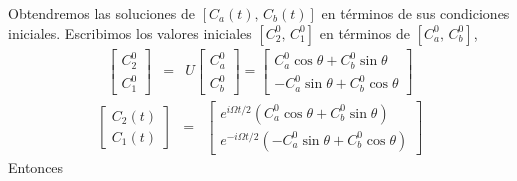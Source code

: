 \documentclass[twocolumn,aps,eqsecnum]{revtex4}
\begin{document}
Obtendremos las soluciones de $[ C_a(t), \, C_b(t) ]$ en 
t\'erminos de sus condiciones iniciales. Escribimos los valores 
iniciales $[ C_2^0, \, C_1^0 ]$ en t\'erminos de 
$[ C_a^0, \, C_b^0 ]$, 
%
\begin{eqnarray*}
\left[ \begin{array}{c} C_2^0 \\ C_1^0 \end{array} \right] 
&=& U \left[ \begin{array}{c} C_a^0 \\ C_b^0 \end{array} \right] 
= \left[ \begin{array}{c} C_a^0\cos{\theta} + C_b^0 \sin{\theta} \\ 
    -C_a^0\sin{\theta} + C_b^0\cos{\theta} \end{array} \right] 
\end{eqnarray*}
%
\begin{eqnarray*}
\left[ \begin{array}{c} C_2(t) \\ C_1(t) \end{array} \right] 
&=& \left[ \begin{array}{c} e^{i\Omega t/2}
    ( C_a^0\cos{\theta} + C_b^0 \sin{\theta} ) \\ 
    e^{-i\Omega t/2}
    (-C_a^0\sin{\theta} + C_b^0\cos{\theta} ) \end{array} \right] 
\end{eqnarray*}
Entonces 
\end{document}
